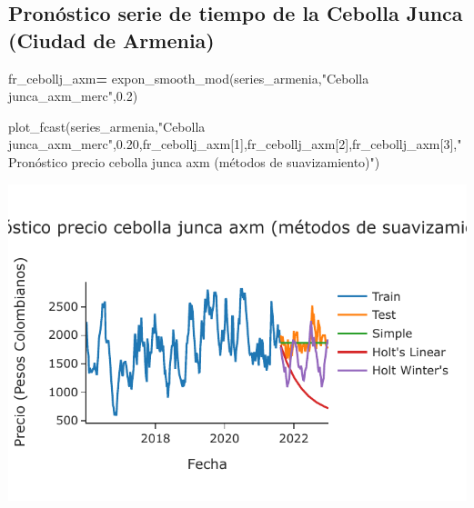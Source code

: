 \documentclass[
]{book}
\newenvironment{Shaded}{\begin{snugshade}}{\end{snugshade}}
\newcommand{\DecValTok}[1]{\textcolor[rgb]{0.00,0.00,0.81}{#1}}
\newcommand{\FloatTok}[1]{\textcolor[rgb]{0.00,0.00,0.81}{#1}}
\newcommand{\NormalTok}[1]{#1}
\newcommand{\OperatorTok}[1]{\textcolor[rgb]{0.81,0.36,0.00}{\textbf{#1}}}
\newcommand{\StringTok}[1]{\textcolor[rgb]{0.31,0.60,0.02}{#1}}
\begin{document}
\hypertarget{pronuxf3stico-serie-de-tiempo-de-la-cebolla-junca-ciudad-de-armenia}{%
\subsection{Pronóstico serie de tiempo de la Cebolla Junca (Ciudad de Armenia)}\label{pronuxf3stico-serie-de-tiempo-de-la-cebolla-junca-ciudad-de-armenia}}

\begin{Shaded}
\begin{Highlighting}[]

\NormalTok{fr\_cebollj\_axm}\OperatorTok{=}\NormalTok{ expon\_smooth\_mod(series\_armenia,}\StringTok{"Cebolla junca\_axm\_merc"}\NormalTok{,}\FloatTok{0.2}\NormalTok{)}

\NormalTok{plot\_fcast(series\_armenia,}\StringTok{"Cebolla junca\_axm\_merc"}\NormalTok{,}\FloatTok{0.20}\NormalTok{,fr\_cebollj\_axm[}\DecValTok{1}\NormalTok{],fr\_cebollj\_axm[}\DecValTok{2}\NormalTok{],fr\_cebollj\_axm[}\DecValTok{3}\NormalTok{],}\StringTok{"Pronóstico precio cebolla junca axm (métodos de suavizamiento)"}\NormalTok{)}
\end{Highlighting}
\end{Shaded}

\includegraphics{bookdown-demo_files/figure-latex/unnamed-chunk-134-121.pdf}
\end{document}
